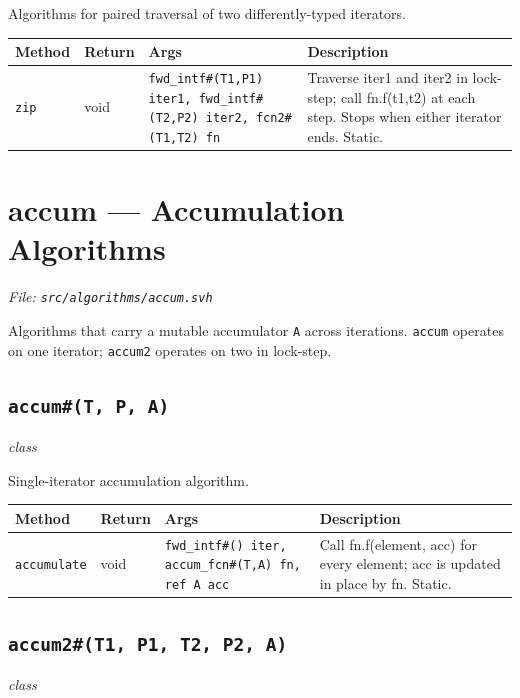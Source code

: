\documentclass[11pt,letterpaper]{report}
\begin{document}
Algorithms for paired traversal of two differently-typed iterators.

\begin{xltabular}{\linewidth}{>{\small}p{1.35in} >{\small}p{1.25in} >{\small}p{0.95in} >{\small}X}
\toprule
\textbf{Method} & \textbf{Return} & \textbf{Args} & \textbf{Description} \\
\midrule
\endhead
\bottomrule
\endfoot
\texttt{zip} & void & \texttt{fwd\_intf\#(T1,P1) iter1, fwd\_intf\#(T2,P2) iter2, fcn2\#(T1,T2) fn} & Traverse iter1 and iter2 in lock-step; call fn.f(t1,t2) at each step. Stops when either iterator ends. Static. \\
\end{xltabular}

\section{accum --- Accumulation Algorithms}
\noindent\small\textit{File: \texttt{src/algorithms/accum.svh}}\par

Algorithms that carry a mutable accumulator \texttt{A} across iterations. \texttt{accum} operates on one iterator; \texttt{accum2} operates on two in lock-step.

\subsection*{\texttt{accum\#(T, P, A)}}
\noindent\small\textit{class}\par

Single-iterator accumulation algorithm.

\begin{xltabular}{\linewidth}{>{\small}p{1.35in} >{\small}p{1.25in} >{\small}p{0.95in} >{\small}X}
\toprule
\textbf{Method} & \textbf{Return} & \textbf{Args} & \textbf{Description} \\
\midrule
\endhead
\bottomrule
\endfoot
\texttt{accumulate} & void & \texttt{fwd\_intf\#() iter, accum\_fcn\#(T,A) fn, ref A acc} & Call fn.f(element, acc) for every element; acc is updated in place by fn. Static. \\
\end{xltabular}

\subsection*{\texttt{accum2\#(T1, P1, T2, P2, A)}}
\noindent\small\textit{class}\par
\end{document}
